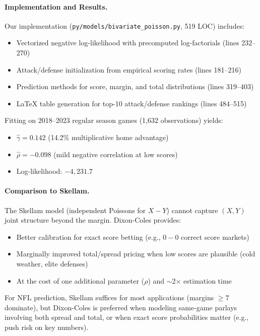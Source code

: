 \paragraph{Implementation and Results.}
Our implementation (\texttt{py/models/bivariate\_poisson.py}, 519 LOC) includes:
\begin{itemize}
  \item Vectorized negative log-likelihood with precomputed log-factorials (lines 232--270)
  \item Attack/defense initialization from empirical scoring rates (lines 181--216)
  \item Prediction methods for score, margin, and total distributions (lines 319--403)
  \item LaTeX table generation for top-10 attack/defense rankings (lines 484--515)
\end{itemize}

\noindent Fitting on 2018--2023 regular season games (1,632 observations) yields:
\begin{itemize}
  \item $\hat\gamma=0.142$ (14.2\% multiplicative home advantage)
  \item $\hat\rho=-0.098$ (mild negative correlation at low scores)
  \item Log-likelihood: $-4,231.7$
\end{itemize}

\paragraph{Comparison to Skellam.}
The Skellam model (independent Poissons for $X-Y$) cannot capture $(X,Y)$ joint structure beyond the margin. Dixon-Coles provides:
\begin{itemize}
  \item Better calibration for exact score betting (e.g., $0{-}0$ correct score markets)
  \item Marginally improved total/spread pricing when low scores are plausible (cold weather, elite defenses)
  \item At the cost of one additional parameter ($\rho$) and $\sim$2× estimation time
\end{itemize}

For NFL prediction, Skellam suffices for most applications (margins $\ge 7$ dominate), but Dixon-Coles is preferred when modeling same-game parlays involving both spread and total, or when exact score probabilities matter (e.g., push risk on key numbers).

